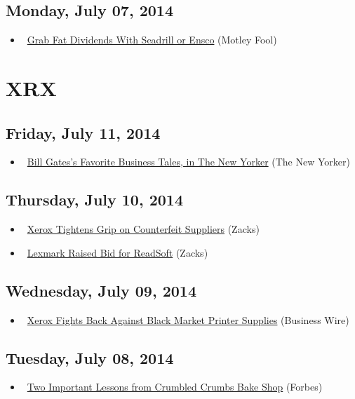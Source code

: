 \documentclass[11pt,asymmetric]{article}
\begin{document}
\subsection*{Monday, July 07, 2014}
\begin{itemize}
\item\ \href{http://www.fool.com/investing/etf/2014/07/07/grab-fat-dividends-with-seadrill-or-ensco.aspx?source=eogyholnk0000001}{Grab Fat Dividends With Seadrill or Ensco} (Motley Fool)
\end{itemize}

\section*{XRX}

\subsection*{Friday, July 11, 2014}
\begin{itemize}
\item\ \href{http://www.newyorker.com/online/blogs/currency/2014/07/bill-gates-favorite-business-book.html}{Bill Gates’s Favorite Business Tales, in The New Yorker} (The New Yorker)
\end{itemize}
\subsection*{Thursday, July 10, 2014}
\begin{itemize}
\item\ \href{http://finance.yahoo.com/news/xerox-tightens-grip-counterfeit-suppliers-155007981.html}{Xerox Tightens Grip on Counterfeit Suppliers} (Zacks)
\item\ \href{http://finance.yahoo.com/news/lexmark-raised-bid-readsoft-145021748.html}{Lexmark Raised Bid for ReadSoft} (Zacks)
\end{itemize}
\subsection*{Wednesday, July 09, 2014}
\begin{itemize}
\item\ \href{http://finance.yahoo.com/news/xerox-fights-back-against-black-140000296.html}{Xerox Fights Back Against Black Market Printer Supplies} (Business Wire)
\end{itemize}
\subsection*{Tuesday, July 08, 2014}
\begin{itemize}
\item\ \href{http://www.forbes.com/sites/adamhartung/2014/07/08/two-lessons-from-crumbled-crumbs-bake-shop/?partner=yahoofeed}{Two Important Lessons from Crumbled Crumbs Bake Shop} (Forbes)
\end{itemize}
\end{document}
